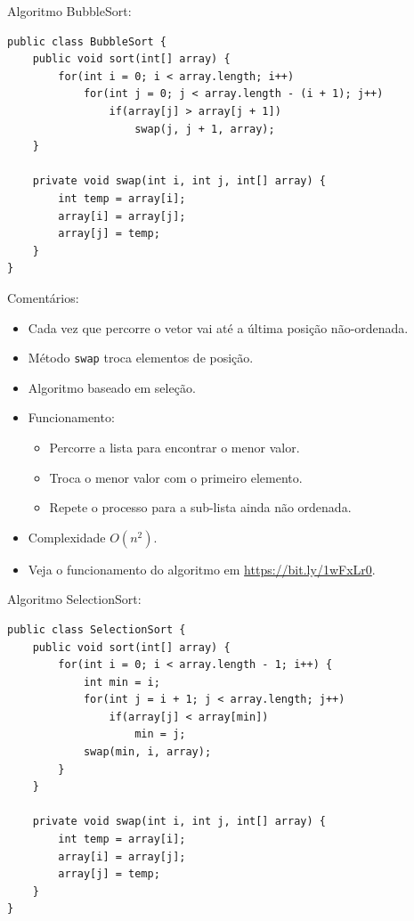 \medskip

Algoritmo BubbleSort:
\begin{verbatim}
public class BubbleSort {
	public void sort(int[] array) {
		for(int i = 0; i < array.length; i++)
			for(int j = 0; j < array.length - (i + 1); j++)
				if(array[j] > array[j + 1])
					swap(j, j + 1, array);
	}
	
	private void swap(int i, int j, int[] array) {
		int temp = array[i];
		array[i] = array[j];
		array[j] = temp;
	}
}
\end{verbatim}

\medskip

{\color{redtext}
Comentários:
\begin{itemize}
	\item Cada vez que percorre o vetor vai até a última posição não-ordenada.
	\item Método \texttt{swap} troca elementos de posição.
\end{itemize}
}

\clearpage


\begin{itemize}
	\item Algoritmo baseado em seleção.
	\item Funcionamento:
	\begin{itemize}
		\item Percorre a lista para encontrar o menor valor.
		\item Troca o menor valor com o primeiro elemento.
		\item Repete o processo para a sub-lista ainda não ordenada.
	\end{itemize}
	\item Complexidade $O(n^2)$.
	\item Veja o funcionamento do algoritmo em \url{https://bit.ly/1wFxLr0}.
\end{itemize}

\medskip

Algoritmo SelectionSort:
\begin{verbatim}
public class SelectionSort {	
	public void sort(int[] array) {
		for(int i = 0; i < array.length - 1; i++) {
			int min = i;
			for(int j = i + 1; j < array.length; j++)
				if(array[j] < array[min])
					min = j;
			swap(min, i, array);
		}
	}
	
	private void swap(int i, int j, int[] array) {
		int temp = array[i];
		array[i] = array[j];
		array[j] = temp;
	}
}
\end{verbatim}

